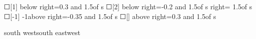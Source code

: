 \begin{scope}[new]
    {☐[1]}
    {}{below right=0.3 and 1.5of s}
    {☐[2]}
    {}{below right=-0.2 and 1.5of s}
    {}
    {}{right= 1.5of s}
    {☐[-1]}
    {-1}{above right=-0.35 and 1.5of s}
    {☐[]}
    {}{above right=0.3 and 1.5of s}

    {\emoji{\shaftDefinitionElevatorSideParameterIcon}}{}{south west}{south east}{west}
\end{scope}

